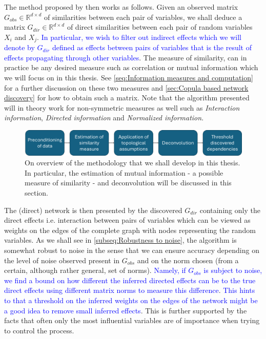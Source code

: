 \documentclass[../Thesis.tex]{subfiles}
\begin{document}
The method proposed by \cite{Network-deconvolution-as-a-general-method-to-distinguish-direct-dependencies-in-networks} then works as follows. Given an observed matrix $G_{obs} \in \mathbb{R}^{d \times d}$ of similarities between each pair of variables, we shall deduce a matrix $G_{dir} \in \mathbb{R}^{d \times d}$ of direct similarities between each pair of random variables $X_i$ and $X_j$. \textcolor{blue}{In particular, we wish to filter out indirect effects which we will denote by $G_{dir}$ defined as effects between pairs of variables that is the result of effects propagating through other variables}. The measure of similarity, can in practice be any desired measure such as correlation or mutual information which we will focus on in this thesis. See \autoref{seq:Information measures and computation} for a further discussion on these two measures and \autoref{sec:Copula based network discovery} for how to obtain such a matrix. Note that the algorithm presented will in theory work for non-symmetric measures as well such as \textit{Interaction information}, \textit{Directed information} and \textit{Normalized information}.

\begin{figure}[ht]
    \centering
    \includegraphics[width = \linewidth]{figures/Framework overview.png}
    \caption{On overview of the methodology that we shall develop in this thesis. In particular, the estimation of mutual information - a possible measure of similarity - and deconvolution will be discussed in this section.}
    \label{fig:Framework overview}
\end{figure}


The (direct) network is then presented by the discovered $G_{dir}$ containing only the direct effects i.e. interaction between pairs of variables which can be viewed as weights on the edges of the complete graph with nodes representing the random variables. As we shall see in \autoref{subseq:Robustness to noise}, the algorithm is somewhat robust to noise in the sense that we can ensure accuracy depending on the level of noise observed present in $G_{obs}$ and on the norm chosen (from a certain, although rather general, set of norms). \textcolor{blue}{Namely, if $G_{obs}$ is subject to noise, we find a bound on how different the inferred directed effects can be to the true direct effects using different matrix norms to measure this difference}. \textcolor{blue}{This hints to that a threshold on the inferred weights on the edges of the network might be a good idea to remove small inferred effects}. This is further supported by the facts that often only the most influential variables are of importance when trying to control the process.
\end{document}
